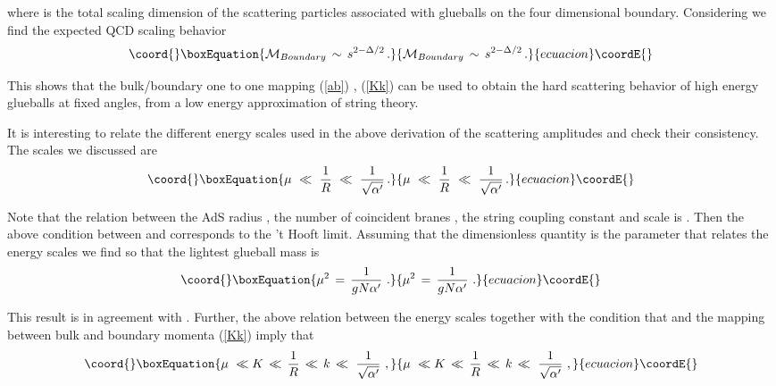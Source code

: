 \documentclass[a4paper,twocolumn,prd,groupedaddress,nofootinbib]{revtex4}
\begin{document}
\noindent where \coordHE{} is the total scaling dimension
of the scattering particles associated with glueballs on the four 
dimensional boundary. Considering  \coordHE{} we find 
the expected QCD scaling behavior\cite{QCD1,BRO}
\begin{equation}\coord{}\boxEquation{
 {\cal M}_{Boundary} \,\sim \,s^{2  - \Delta/2 } 
\,.
}{
 {\cal M}_{Boundary} \,\sim \,s^{2  - \Delta/2 } 
\,.
}{ecuacion}\coordE{}\end{equation}

\noindent This shows that the bulk/boundary one to one mapping (\ref{ab}) , (\ref{Kk})
can be used to obtain the hard scattering behavior of high energy glueballs 
at fixed angles, from a low energy approximation of string theory. 

It is interesting to relate the different energy scales used in the above
derivation of the scattering amplitudes and check their consistency. 
The scales we discussed are 
\begin{equation}\coord{}\boxEquation{
\mu \,\,\ll \,\,{1\over R}\,\,\ll\,\, {1\over \sqrt{\alpha^\prime}}\,.
}{
\mu \,\,\ll \,\,{1\over R}\,\,\ll\,\, {1\over \sqrt{\alpha^\prime}}\,.
}{ecuacion}\coordE{}\end{equation}

\noindent Note that the relation between the AdS radius \coordHE{} , the number of
coincident branes \coordHE{}, the string coupling constant \coordHE{} and scale \myHighlight{$\alpha^\prime$}\coordHE{}
is \coordHE{}.
Then the above condition between \coordHE{} and \myHighlight{$\alpha^\prime$}\coordHE{} corresponds
to the \myHighlight{$\,$}\coordHE{} 't Hooft limit\cite{Planar}.
Assuming that the dimensionless quantity \coordHE{} is the parameter
that relates the energy scales we find \coordHE{}
so that the lightest glueball mass is
\begin{equation}\coord{}\boxEquation{
\mu^2 \,=\,{1\over g N \alpha^\prime}\,\,.
}{
\mu^2 \,=\,{1\over g N \alpha^\prime}\,\,.
}{ecuacion}\coordE{}\end{equation}

\noindent  This result is in agreement with \cite{MN}. Further,  the 
above relation between the energy scales together with the condition that \coordHE{}
and the mapping between bulk and boundary momenta (\ref{Kk}) imply that
\begin{equation}\coord{}\boxEquation{
\mu \,\,\ll K \,\ll \,{1\over R}\,\ll\,k\,\ll\,\, {1\over \sqrt{\alpha^\prime}}\,\,,
}{
\mu \,\,\ll K \,\ll \,{1\over R}\,\ll\,k\,\ll\,\, {1\over \sqrt{\alpha^\prime}}\,\,,
}{ecuacion}\coordE{}\end{equation}
\end{document}
